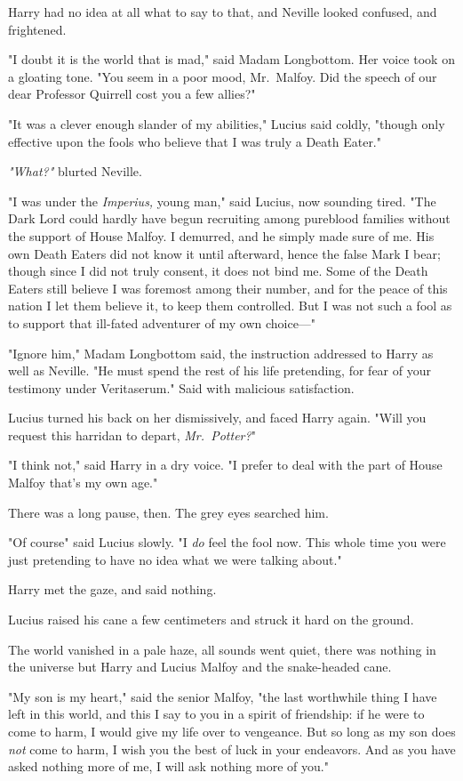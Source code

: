 Harry had no idea at all what to say to that, and Neville looked confused, and
frightened.

"I doubt it is the world that is mad," said Madam Longbottom. Her voice took on
a gloating tone. "You seem in a poor mood, Mr.~Malfoy. Did the speech of our
dear Professor Quirrell cost you a few allies?"

"It was a clever enough slander of my abilities," Lucius said coldly, "though
only effective upon the fools who believe that I was truly a Death Eater."

\emph{"What?"} blurted Neville.

"I was under the \emph{Imperius,} young man," said Lucius, now sounding tired.
"The Dark Lord could hardly have begun recruiting among pureblood families
without the support of House Malfoy. I demurred, and he simply made sure of me.
His own Death Eaters did not know it until afterward, hence the false Mark I
bear; though since I did not truly consent, it does not bind me. Some of the
Death Eaters still believe I was foremost among their number, and for the peace
of this nation I let them believe it, to keep them controlled. But I was not
such a fool as to support that ill-fated adventurer of my own choice\mbox{---}"

"Ignore him," Madam Longbottom said, the instruction addressed to Harry as well
as Neville. "He must spend the rest of his life pretending, for fear of your
testimony under Veritaserum." Said with malicious satisfaction.

Lucius turned his back on her dismissively, and faced Harry again. "Will you
request this harridan to depart, \emph{Mr.~Potter?}"

"I think not," said Harry in a dry voice. "I prefer to deal with the part of
House Malfoy that's my own age."

There was a long pause, then. The grey eyes searched him.

"Of course{\el}" said Lucius slowly. "I \emph{do} feel the fool now. This
whole time you were just pretending to have no idea what we were talking about."

Harry met the gaze, and said nothing.

Lucius raised his cane a few centimeters and struck it hard on the ground.

The world vanished in a pale haze, all sounds went quiet, there was nothing in
the universe but Harry and Lucius Malfoy and the snake-headed cane.

"My son is my heart," said the senior Malfoy, "the last worthwhile thing I have
left in this world, and this I say to you in a spirit of friendship: if he were
to come to harm, I would give my life over to vengeance. But so long as my son
does \emph{not} come to harm, I wish you the best of luck in your endeavors.
And as you have asked nothing more of me, I will ask nothing more of you."

